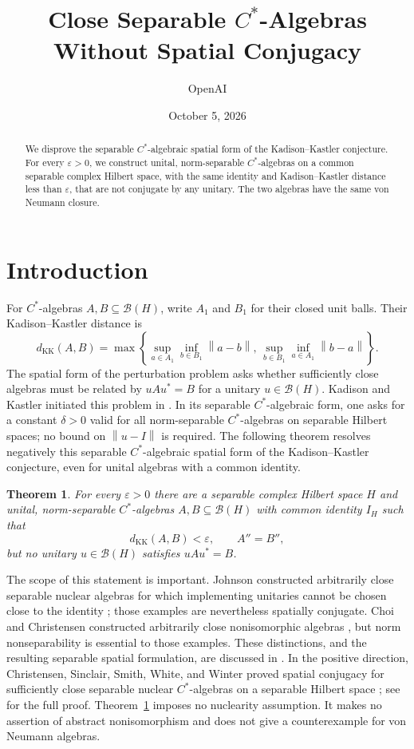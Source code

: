 \documentclass[11pt]{article}
\title{Close Separable $C^*$-Algebras\texorpdfstring{\\}{ }Without Spatial Conjugacy}
\author{OpenAI}
\date{October 5, 2026}
\newtheorem{theorem}{Theorem}[section]
\theoremstyle{definition}
\theoremstyle{remark}
\newcommand{\B}{\mathcal B}
\newcommand{\KK}{d_{\mathrm{KK}}}
\newcommand{\id}{I}
\newcommand{\norm}[1]{\left\|#1\right\|}
\begin{document}
\maketitle

\begin{abstract}
We disprove the separable $C^*$-algebraic spatial form of the
Kadison--Kastler conjecture. For every $\varepsilon>0$, we construct
unital, norm-separable $C^*$-algebras on a common separable complex
Hilbert space, with the same identity and Kadison--Kastler distance less
than $\varepsilon$, that are not conjugate by any unitary. The two
algebras have the same von Neumann closure.
\end{abstract}

\section{Introduction}\label{sec:intro}

For $C^*$-algebras $A,B\subseteq\B(H)$, write $A_1$ and $B_1$ for their
closed unit balls. Their Kadison--Kastler distance is
\begin{equation}\label{eq:kk}
\KK(A,B)=\max\left\{
\sup_{a\in A_1}\inf_{b\in B_1}\norm{a-b},\,
\sup_{b\in B_1}\inf_{a\in A_1}\norm{b-a}\right\}.
\end{equation}
The spatial form of the perturbation problem asks whether sufficiently close
algebras must be related by $uAu^*=B$ for a unitary $u\in\B(H)$.
Kadison and Kastler initiated this problem in \cite{KK72}. In its separable
$C^*$-algebraic form, one asks for a constant $\delta>0$ valid for all
norm-separable $C^*$-algebras on separable Hilbert spaces; no bound on
$\norm{u-\id}$ is required. The following theorem resolves negatively this
separable $C^*$-algebraic spatial form of the Kadison--Kastler conjecture,
even for unital algebras with a common identity.

\begin{theorem}\label{thm:main}
For every $\varepsilon>0$ there are a separable complex Hilbert space $H$
and unital, norm-separable $C^*$-algebras $A,B\subseteq\B(H)$ with common
identity $\id_H$ such that
\[
\KK(A,B)<\varepsilon,\qquad A''=B'',
\]
but no unitary $u\in\B(H)$ satisfies $uAu^*=B$.
\end{theorem}

The scope of this statement is important. Johnson constructed arbitrarily
close separable nuclear algebras for which implementing unitaries cannot be
chosen close to the identity \cite{Johnson82}; those examples are nevertheless
spatially conjugate. Choi and Christensen constructed arbitrarily close
nonisomorphic algebras \cite{CC83}, but norm nonseparability is essential to
those examples. These distinctions, and the resulting separable spatial
formulation, are discussed in \cite{CSSWW10}. In the positive direction,
Christensen, Sinclair, Smith, White, and Winter proved spatial conjugacy for
sufficiently close separable nuclear $C^*$-algebras on a separable Hilbert
space \cite[Theorem~4]{CSSWW10}; see \cite[Theorem~5.4]{CSSWW12} for the full
proof. Theorem~\ref{thm:main} imposes no nuclearity
assumption. It makes no assertion of abstract nonisomorphism and does not
give a counterexample for von Neumann algebras.
\end{document}
